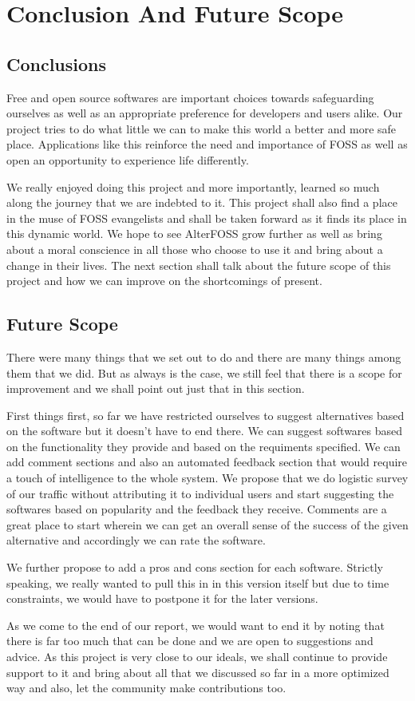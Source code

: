 \chapter{Conclusion And Future Scope}

\section{Conclusions}

Free and open source softwares are important choices towards safeguarding ourselves as well as an appropriate preference for developers and users alike. Our project tries to do what little we can to make this world a better and more safe place. Applications like this reinforce the need and importance of FOSS as well as open an opportunity to experience life differently. 

We really enjoyed doing this project and more importantly, learned so much along the journey that we are indebted to it. This project shall also find a place in the muse of FOSS evangelists and shall be taken forward as it finds its place in this dynamic world. We hope to see AlterFOSS grow further as well as bring about a moral conscience in all those who choose to use it and bring about a change in their lives. The next section shall talk about the future scope of this project and how we can improve on the shortcomings of present.

\section{Future Scope}
There were many things that we set out to do and there are many things among them that we did. But as always is the case, we still feel that there is a scope for improvement and we shall point out just that in this section.

First things first, so far we have restricted ourselves to suggest alternatives based on the software but it doesn't have to end there. We can suggest softwares based on the functionality they provide and based on the requiments specified. We can add comment sections and also an automated feedback section that would require a touch of intelligence to the whole system.
We propose that we do logistic survey of our traffic without attributing it to individual users and start suggesting the softwares based on popularity and the feedback they receive. Comments are a great place to start wherein we can get an overall sense of the success of the given alternative and accordingly we can rate the software.

We further propose to add a pros and cons section for each software. Strictly speaking, we really wanted to pull this in in this version itself but due to time constraints, we would have to postpone it for the later versions.

As we come to the end of our report, we would want to end it by noting that there is far too much that can be done and we are open to suggestions and advice. As this project is very close to our ideals, we shall continue to provide support to it and bring about all that we discussed so far in a more optimized way and also, let the community make contributions too.